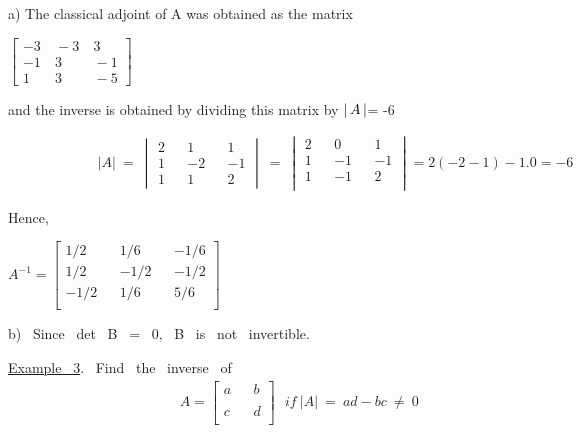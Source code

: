 \documentclass[11pt]{amsbook}
\begin{document}
\begin{hSolution}

a) The classical adjoint of A was obtained as the matrix
\begin{center}
$\begin{bmatrix} 
-3 &\ -3 &\ 3 \\
-1 &\  3 &\  -1 \\
 1 &\  3 &\ -5
\end{bmatrix}$
\end{center}
and the inverse is obtained by dividing this matrix by $\left \lvert \, A \, \right \rvert$= -6

\begin{align*}
	\qquad &&&&& |A| \ = \
	\begin{vmatrix}
		2  &&   1    &&  1\\
		1  &&   -2    &&   -1\\
		1  &&   1    &&  2
	\end{vmatrix} \ = \
	\begin{vmatrix}
		2  &&   0    &&  1\\
		1  &&   -1    &&   -1\\
		1  &&   -1    &&  2\\
	\end{vmatrix}=
	2(-2-1) -1.0 =-6
\end{align*}
\begin{flushleft}
	Hence,
\end{flushleft}

\begin{center}
$ A^{-1} = 
$$
\begin{bmatrix}

	1/2  && 1/6       &&   -1/6\\
	1/2  &&   -1/2    &&   -1/2\\
	-1/2  &&   1/6    &&   5/6\\

\end{bmatrix}
 $$
 $
\end{center}

\setlength{\parindent}{3ex}
 
 b) \ Since \ det \  B \ = \ 0, \  B \ is \ not \ invertible. 
\vspace{0.1cm}
\end{hSolution}
\underline{Example \ 3}.  \ Find \ the \ inverse \ of \\
\begin{align*}   
     &&&&&&&   A=
         \begin{bmatrix}
    		 a  &&   b      \\
         	\\
         	c  &&   d      \\
         \end{bmatrix} 
\ \ \ if \ |A| \ = \ ad-bc \ \neq \ 0
\end{align*}
\end{document}
